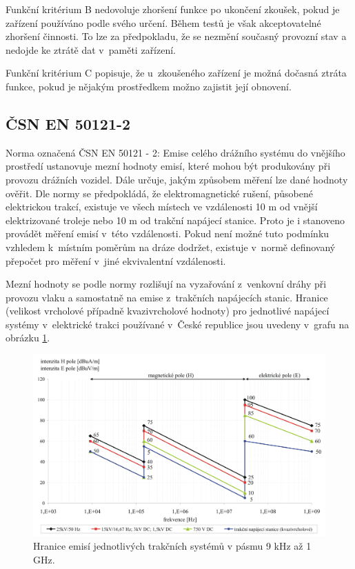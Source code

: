 Funkční kritérium B nedovoluje zhoršení funkce po ukončení zkoušek, pokud je zařízení používáno podle svého určení. Během testů je však akceptovatelné zhoršení činnosti. To lze za předpokladu, že se nezmění současný provozní stav a nedojde ke ztrátě dat v~paměti zařízení.

Funkční kritérium C popisuje, že u~zkoušeného zařízení je možná dočasná ztráta funkce, pokud je nějakým prostředkem možno zajistit její obnovení.

\subsection{ČSN EN 50121-2}
Norma označená ČSN EN 50121 - 2: Emise celého drážního  systému do vnějšího prostředí ustanovuje mezní hodnoty emisí, které mohou být produkovány při provozu drážních vozidel. Dále určuje, jakým způsobem měření lze dané hodnoty ověřit. Dle normy se předpokládá, že elektromagnetické rušení, působené elektrickou trakcí, existuje ve všech místech ve vzdálenosti 10 m od vnější elektrizované troleje nebo 10 m od trakční napájecí stanice. Proto je i stanoveno provádět měření emisí v~této vzdálenosti. Pokud není možné tuto podmínku vzhledem k~místním poměrům na dráze dodržet, existuje v~normě definovaný přepočet pro měření v~jiné ekvivalentní vzdálenosti. 

Mezní hodnoty se podle normy rozlišují na vyzařování z~venkovní dráhy při provozu vlaku a samostatně na emise z~trakčních napájecích stanic. Hranice (velikost vrcholové případně kvazivrcholové hodnoty) pro jednotlivé napájecí systémy v~elektrické trakci používané v~České republice jsou uvedeny v~grafu na obrázku \ref{obr:emc_emise}.

\begin{figure}[!h]
	\centering
	\includegraphics[width=12cm]{emc_emise.png}
	\caption{Hranice emisí jednotlivých trakčních systémů v pásmu 9 kHz až 1 GHz.}
	\label{obr:emc_emise}
\end{figure}

